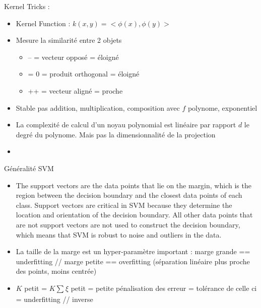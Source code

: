\documentclass{article}
\theoremstyle{plain}%
\theoremstyle{definition}
\theoremstyle{remark}
\begin{document}
Kernel Tricks : 
\begin{itemize}
    \item Kernel Function : $ k(x,y) = <\phi (x), \phi(y)> $
    \item Mesure la similarité entre 2 objets \begin{itemize}
        \item -- = vecteur opposé = éloigné
        \item = 0 = produit orthogonal = éloigné 
        \item ++ = vecteur aligné = proche
    \end{itemize}
    \item Stable pas addition, multiplication, composition avec $ f $ polynome, exponentiel
    \item La complexité de calcul d'un noyau polynomial est linéaire par rapport $d$ le degré du polynome. Mais pas la dimensionnalité de la projection
    \item 
\end{itemize}

Généralité SVM 
\begin{itemize}
    \item The support vectors are the data points that lie on the margin, which is the region between the decision boundary and the closest data points of each class. Support vectors are critical in SVM because they determine the location and orientation of the decision boundary. All other data points that are not support vectors are not used to construct the decision boundary, which means that SVM is robust to noise and outliers in the data.
    \item La taille de la marge est un hyper-paramètre important : marge grande == underfitting // marge petite == overfitting (séparation linéaire plus proche des points, moins centrée)
    \item $ K $ petit = $ K \sum_{}^{}\xi  $ petit = petite pénalisation des erreur = tolérance de celle ci = underfitting // inverse
\end{itemize}
\end{document}
